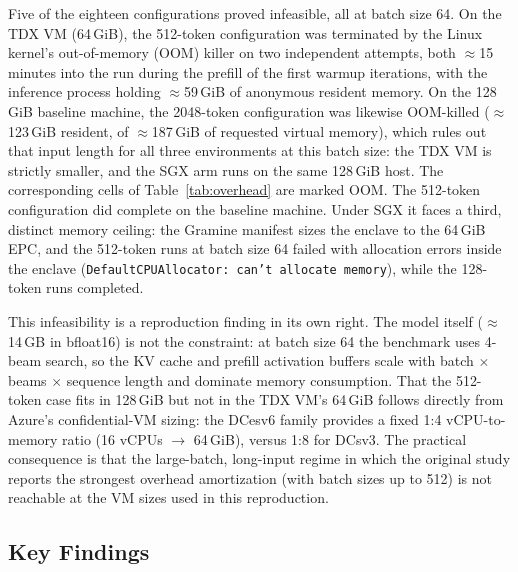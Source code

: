 \documentclass[sigconf]{acmart}
\begin{document}
Five of the eighteen configurations proved infeasible, all at batch size 64. On the TDX
VM (64\,GiB), the 512-token configuration was terminated by the Linux kernel's
out-of-memory (OOM) killer on two independent attempts, both $\approx$15 minutes into
the run during the prefill of the first warmup iterations, with the inference process
holding $\approx$59\,GiB of anonymous resident memory. On the 128\,GiB baseline
machine, the 2048-token configuration was likewise OOM-killed ($\approx$123\,GiB
resident, of $\approx$187\,GiB of requested virtual memory), which rules out that input
length for all three environments at this batch size: the TDX VM is strictly smaller,
and the SGX arm runs on the same 128\,GiB host. The corresponding cells of
Table~\ref{tab:overhead} are marked OOM. The 512-token configuration did complete on
the baseline machine. Under SGX it faces a third, distinct memory ceiling: the Gramine
manifest sizes the enclave to the 64\,GiB EPC, and the 512-token runs at batch size 64
failed with allocation errors inside the enclave
(\texttt{DefaultCPUAllocator: can't allocate memory}), while the 128-token runs
completed.

This infeasibility is a reproduction finding in its own right. The model itself
($\approx$14\,GB in bfloat16) is not the constraint: at batch size 64 the benchmark
uses 4-beam search, so the KV cache and prefill activation buffers scale with batch
$\times$ beams $\times$ sequence length and dominate memory consumption. That the
512-token case fits in 128\,GiB but not in the TDX VM's 64\,GiB follows directly from
Azure's confidential-VM sizing: the DCesv6 family provides a fixed 1:4 vCPU-to-memory
ratio (16 vCPUs $\rightarrow$ 64\,GiB), versus 1:8 for DCsv3. The practical consequence
is that the large-batch, long-input regime in which the original study reports the
strongest overhead amortization (with batch sizes up to 512) is not reachable at the
VM sizes used in this reproduction.

\subsection{Key Findings}
\label{sec:key-findings}
\end{document}
